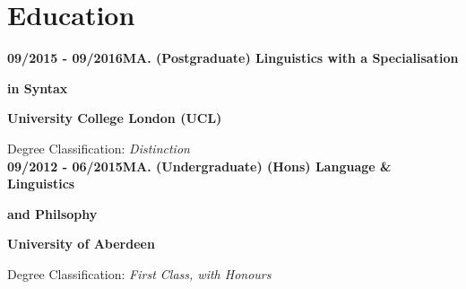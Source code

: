 \section{Education}

\textbf{09/2015 - 09/2016\hspace{2.75em}MA. (Postgraduate) Linguistics with a Specialisation}

\hspace{12.35em}\textbf{in Syntax}

\hspace{12.35em}\textbf{University College London (UCL)}

\hspace{12.35em}Degree Classification: \emph{Distinction}\\

\textbf{09/2012 - 06/2015\hspace{2.75em}MA. (Undergraduate) (Hons) Language \& Linguistics}

\hspace{12.35em}\textbf{and Philsophy}

\hspace{12.35em}\textbf{University of Aberdeen}

\hspace{12.35em}Degree Classification: \emph{First Class, with Honours}

